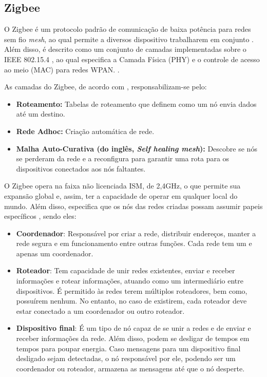 \subsection{Zigbee}

O Zigbee é um protocolo padrão de comunicação de baixa potência para redes sem fio \textit{mesh}, ao qual permite a diversos dispositivo trabalharem em conjunto \cite{Faludi2011}. Além disso, é descrito como um conjunto de camadas implementadas sobre o IEEE 802.15.4 \cite{Faludi2011}, ao qual especifica a Camada Física (PHY) e o controle de acesso ao meio (MAC) para redes WPAN. \cite{IEEE2011}.

As camadas do Zigbee, de acordo com , responsabilizam-se pelo:

\begin{itemize} \parskip -4pt
	\item \textbf{Roteamento:} Tabelas de roteamento que definem como um nó envia dados até um 
	destino.
	\item \textbf{Rede Adhoc:} Criação automática de rede.
	\item \textbf{Malha Auto-Curativa (do inglês, \textit{Self healing mesh}):} Descobre se nós se perderam da rede e a 
	reconfigura para garantir uma rota para os dispositivos conectados aos nós faltantes.
\end{itemize}

O Zigbee opera na faixa não licenciada ISM, de 2,4GHz, o que permite sua expansão global e, assim, ter a capacidade de operar em qualquer local do mundo. Além disso, especifica que os nós das redes criadas possam assumir papeis específicos \cite{Faludi2011}, sendo eles:

\begin{itemize} \parskip -4pt
	\item \textbf{Coordenador}: Responsável por criar a rede, distribuir endereços, manter a rede segura e em funcionamento entre outras funções. Cada rede tem um e apenas um coordenador.
	\item \textbf{Roteador}: Tem capacidade de unir redes existentes, enviar e receber informações e rotear 	informações, atuando como um intermediário entre dispositivos. É permitido às redes terem múltiplos roteadores, bem como, possuírem nenhum. No entanto, no caso de existirem, cada roteador deve estar conectado a um coordenador ou outro roteador.
	\item \textbf{Dispositivo final}: É um tipo de nó capaz de se unir a redes e de enviar e receber informações da rede. Além disso, podem se desligar de tempos em tempos para poupar energia. Caso mensagens para um dispositivo final desligado sejam detectadas, o nó responsável por ele, podendo ser um coordenador ou roteador, armazena as mensagens até que o nó desperte.
\end{itemize}

